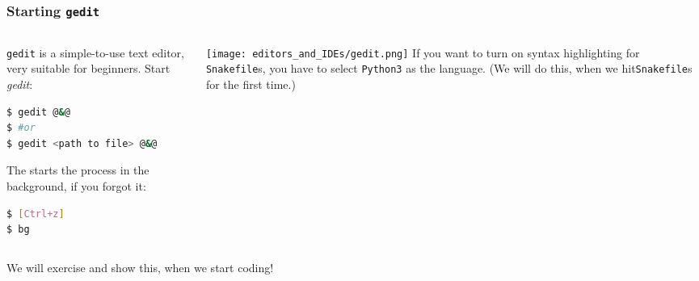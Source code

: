 \begin{frame}[fragile]
  \frametitle{Starting \texttt{gedit}}
  \begin{columns}[T]
  	 \begin{column}{.5\textwidth}
  	   \texttt{gedit} is a simple-to-use text editor, very suitable for beginners.\newline
        Start \textit{gedit}:
       \begin{lstlisting}[language=Bash, style=Shell]
$ gedit @&@
$ #or
$ gedit <path to file> @&@
      \end{lstlisting}
      The  starts the process in the background, if you forgot it:
      \begin{lstlisting}[language=Bash, style=Shell]
$ [Ctrl+z]
$ bg
      \end{lstlisting}	
    \end{column}
    \begin{column}{.5\textwidth}
      \texttt{[image: editors\_and\_IDEs/gedit.png]}	\newline
      If you want to turn on syntax highlighting for \texttt{Snakefile}s, you have to select \texttt{Python3} as the language. (We will do this, when we hit\texttt{Snakefile}s for the first time.)
    \end{column} 
  \end{columns}
  \begin{hint}[Note]
    We will exercise and show this, when we start coding!
  \end{hint}
\end{frame}